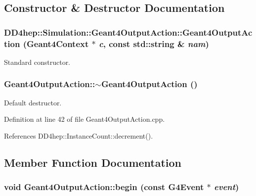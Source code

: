 \subsection{Constructor \& Destructor Documentation}
\hypertarget{class_d_d4hep_1_1_simulation_1_1_geant4_output_action_a983f32c2248efafa8c632b9608820f86}{
\subsubsection[{Geant4OutputAction}]{\setlength{\rightskip}{0pt plus 5cm}DD4hep::Simulation::Geant4OutputAction::Geant4OutputAction ({\bf Geant4Context} $\ast$ {\em c}, \/  const std::string \& {\em nam})}}
\label{class_d_d4hep_1_1_simulation_1_1_geant4_output_action_a983f32c2248efafa8c632b9608820f86}


Standard constructor. \hypertarget{class_d_d4hep_1_1_simulation_1_1_geant4_output_action_aeead76ac5f330277dfb11c924bbfbc08}{
\subsubsection[{$\sim$Geant4OutputAction}]{\setlength{\rightskip}{0pt plus 5cm}Geant4OutputAction::$\sim$Geant4OutputAction ()}}
\label{class_d_d4hep_1_1_simulation_1_1_geant4_output_action_aeead76ac5f330277dfb11c924bbfbc08}


Default destructor. 

Definition at line 42 of file Geant4OutputAction.cpp.

References DD4hep::InstanceCount::decrement().

\subsection{Member Function Documentation}
\hypertarget{class_d_d4hep_1_1_simulation_1_1_geant4_output_action_afaad36616c890ac39e80421d340efd47}{
\subsubsection[{begin}]{\setlength{\rightskip}{0pt plus 5cm}void Geant4OutputAction::begin (const G4Event $\ast$ {\em event})}}
\label{class_d_d4hep_1_1_simulation_1_1_geant4_output_action_afaad36616c890ac39e80421d340efd47}


